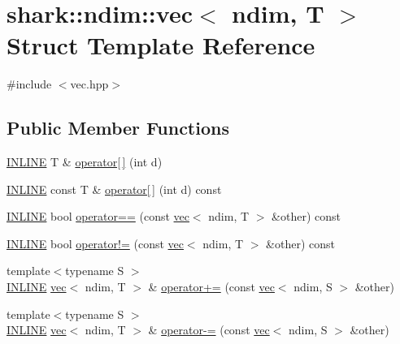 \hypertarget{structshark_1_1ndim_1_1vec}{}\section{shark\+:\+:ndim\+:\+:vec$<$ ndim, T $>$ Struct Template Reference}
\label{structshark_1_1ndim_1_1vec}


{\ttfamily \#include $<$vec.\+hpp$>$}

\subsection*{Public Member Functions}
\begin{DoxyCompactItemize}
\item 
\hyperlink{common_8hpp_a2eb6f9e0395b47b8d5e3eeae4fe0c116}{I\+N\+L\+I\+NE} T \& \hyperlink{structshark_1_1ndim_1_1vec_ab5506a5f5d9f1f8a2722626620fa305c}{operator\mbox{[}$\,$\mbox{]}} (int d)
\item 
\hyperlink{common_8hpp_a2eb6f9e0395b47b8d5e3eeae4fe0c116}{I\+N\+L\+I\+NE} const T \& \hyperlink{structshark_1_1ndim_1_1vec_a7ef60f43a2b6e0429a85ab67f323bd59}{operator\mbox{[}$\,$\mbox{]}} (int d) const
\item 
\hyperlink{common_8hpp_a2eb6f9e0395b47b8d5e3eeae4fe0c116}{I\+N\+L\+I\+NE} bool \hyperlink{structshark_1_1ndim_1_1vec_a796dd27a2b072a4b5e0618bb5851bfa8}{operator==} (const \hyperlink{structshark_1_1ndim_1_1vec}{vec}$<$ ndim, T $>$ \&other) const
\item 
\hyperlink{common_8hpp_a2eb6f9e0395b47b8d5e3eeae4fe0c116}{I\+N\+L\+I\+NE} bool \hyperlink{structshark_1_1ndim_1_1vec_af57ada01823047ae447cc294e4c4bfe0}{operator!=} (const \hyperlink{structshark_1_1ndim_1_1vec}{vec}$<$ ndim, T $>$ \&other) const
\item 
{\footnotesize template$<$typename S $>$ }\\\hyperlink{common_8hpp_a2eb6f9e0395b47b8d5e3eeae4fe0c116}{I\+N\+L\+I\+NE} \hyperlink{structshark_1_1ndim_1_1vec}{vec}$<$ ndim, T $>$ \& \hyperlink{structshark_1_1ndim_1_1vec_a126750e81729ae1c0ccfb60e1eff5ed0}{operator+=} (const \hyperlink{structshark_1_1ndim_1_1vec}{vec}$<$ ndim, S $>$ \&other)
\item 
{\footnotesize template$<$typename S $>$ }\\\hyperlink{common_8hpp_a2eb6f9e0395b47b8d5e3eeae4fe0c116}{I\+N\+L\+I\+NE} \hyperlink{structshark_1_1ndim_1_1vec}{vec}$<$ ndim, T $>$ \& \hyperlink{structshark_1_1ndim_1_1vec_a1fd95421a7d7d555f9e7861f807f79ab}{operator-\/=} (const \hyperlink{structshark_1_1ndim_1_1vec}{vec}$<$ ndim, S $>$ \&other)

\end{DoxyCompactItemize}
